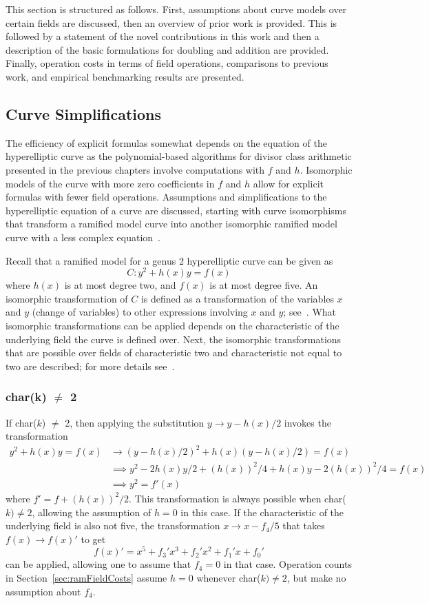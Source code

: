 This section is structured as follows. First, assumptions about curve models
over certain fields are discussed, then an overview of prior work is provided.
This is followed by a statement of the novel contributions in this work and then
a description of the basic formulations for doubling and addition are provided.
Finally, operation costs in terms of field operations, comparisons to
previous work, and empirical benchmarking results are presented.

\subsection{Curve Simplifications} 
\label{sect:curvesimplifications} 
The efficiency of explicit formulas somewhat depends on the equation of the
hyperelliptic curve as the polynomial-based algorithms for divisor class
arithmetic presented in the previous chapters involve computations with $f$ and
$h$. Isomorphic models of the curve with more zero coefficients in $f$ and $h$
allow for explicit formulas with fewer field operations. Assumptions and
simplifications to the hyperelliptic equation of a curve are discussed, starting
with curve isomorphisms that transform a ramified model curve into another
isomorphic ramified model curve with a less complex
equation~\cite{HandbookHECC_2006}. 

Recall that a ramified model for a genus 2 hyperelliptic curve can be given as
$$C : y^2 + h(x)y = f(x) $$ where $h(x)$ is at most degree two, and $f(x)$ is at
most degree five. An isomorphic transformation of $C$ is defined as a
transformation of the variables $x$ and $y$ (change of variables) to other
expressions involving $x$ and $y$; see~\cite{HandbookHECC_2006}. What isomorphic
transformations can be applied depends on the characteristic of the underlying
field the curve is defined over. Next, the isomorphic transformations that are
possible over fields of characteristic two and characteristic not equal to two are
described; for more details see~\cite{Lange_explicit_2005}. 

\subsubsection{char(k) $\neq$ 2}
If char($k$) $\neq$ 2, then applying the substitution $y \rightarrow y - h(x)/2$
invokes the transformation 
\begin{align*}
y^2 + h(x)y = f(x) &\rightarrow (y-h(x)/2)^2 + h(x)(y - h(x)/2) = f(x) \\
                   &\implies y^2 -2h(x)y/2 + (h(x))^2/4 + h(x)y -2(h(x))^2/4 = f(x) \\
                   &\implies y^2 = f'(x)
\end{align*} 
where $f' = f + (h(x))^2/2$. This transformation is always possible when
char($k) \neq 2$, allowing the assumption of $h=0$ in this case. If the
characteristic of the underlying field is also not five, the transformation $ x
\rightarrow x - f_4/5 $ that takes $f(x) \rightarrow f(x)'$ to get $$ f(x)' =
x^5 + f_3'x^3 + f_2'x^2 + f_1'x + f_0'$$ can be applied, allowing one to assume
that $f_4 = 0$ in that case. Operation counts in Section~\ref{sec:ramFieldCosts}
assume $h = 0$ whenever char($k) \neq 2$, but make no assumption about $f_4$.

